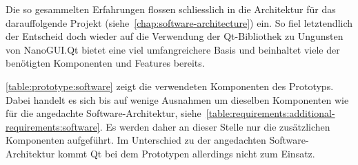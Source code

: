 Die so gesammelten Erfahrungen flossen schliesslich in die Architektur für das
darauffolgende Projekt (siehe~\autoref{chap:software-architecture}) ein. So fiel
letztendlich der Entscheid doch wieder auf die Verwendung der Qt-Bibliothek zu
Ungunsten von NanoGUI.\@ Qt bietet eine viel umfangreichere Basis und beinhaltet
viele der benötigten Komponenten und Features bereits.

\autoref{table:prototype:software} zeigt die verwendeten Komponenten des
Prototyps. Dabei handelt es sich bis auf wenige Ausnahmen um dieselben
Komponenten wie für die angedachte Software-Architektur,
siehe~\autoref{table:requirements:additional-requirements:software}. Es werden
daher an dieser Stelle nur die zusätzlichen Komponenten aufgeführt. Im
Unterschied zu der angedachten Software-Architektur kommt Qt bei dem Prototypen
allerdings nicht zum Einsatz.



